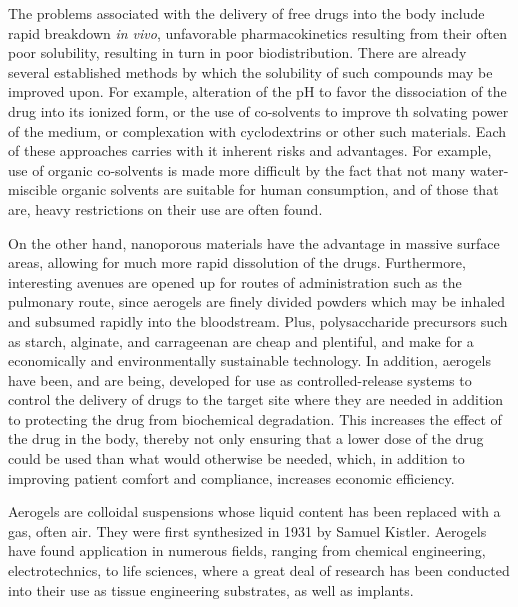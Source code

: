 \documentclass[a4paper,12pt]{article}
\begin{document}
The problems associated with the delivery of free drugs into the body include rapid breakdown \textit{in vivo}, unfavorable pharmacokinetics resulting from their often poor solubility, resulting in turn in poor biodistribution.\supercite{maleki_synthesis_2016} There are already several established methods by which the solubility of such compounds may be improved upon. For example, alteration of the pH to favor the dissociation of the drug into its ionized form, or the use of co-solvents to improve th solvating power of the medium, or complexation with cyclodextrins or other such materials. Each of these approaches carries with it inherent risks and advantages. For example, use of organic co-solvents is made more difficult by the fact that not many water-miscible organic solvents are suitable for human consumption, and of those that are, heavy restrictions on their use are often found.\supercite{aulton_aultons_2013}

On the other hand, nanoporous materials have the advantage in massive surface areas, allowing for much more rapid dissolution of the drugs. Furthermore, interesting avenues are opened up for routes of administration such as the pulmonary route, since aerogels are finely divided powders which may be inhaled and subsumed rapidly into the bloodstream. Plus, polysaccharide precursors such as starch, alginate, and carrageenan are cheap and plentiful, and make for a economically and environmentally sustainable technology.\supercite{garcia-gonzalez_polysaccharide-based_2011} In addition, aerogels have been, and are being, developed for use as controlled-release systems to control the delivery of drugs to the target site where they are needed in addition to protecting the drug from biochemical degradation. This increases the effect of the drug in the body, thereby not only ensuring that a lower dose of the drug could be used than what would otherwise be needed, which, in addition to improving patient comfort and compliance, increases economic efficiency.\supercite{vallet-regi_mesoporous_2007}

Aerogels are colloidal suspensions whose liquid content has been replaced with a gas, often air. They were first synthesized in 1931 by Samuel Kistler.\supercite{ulker_emerging_2014} Aerogels have found application in numerous fields, ranging from chemical engineering, electrotechnics, to life sciences, where a great deal of research has been conducted into their use as tissue engineering substrates, as well as implants.\supercite{stergar_review_2016} 
\end{document}
